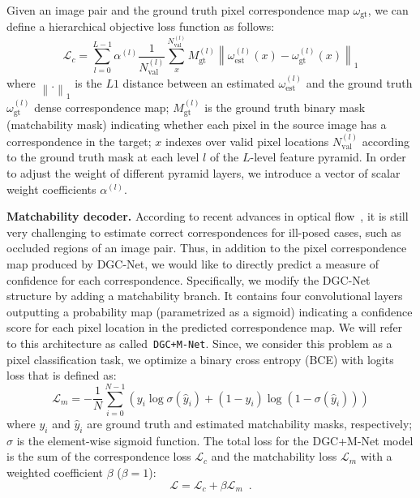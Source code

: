 \documentclass[10pt,twocolumn,letterpaper]{article}
\begin{document}
Given an image pair and the ground truth pixel correspondence map $\omega_\text{gt}$, we can define a hierarchical objective loss function as follows: 
\begin{equation}\label{eq:eq_loss_crsp}
    \mathcal{L}_c = \sum_{l=0}^{L-1} \alpha^{\left(l\right)} \frac{1}{N_\text{val}^{\left(l\right)}} \sum_{x}^{N_\text{val}^{\left(l\right)}} M_\text{gt}^{\left(l\right)} \left\| \omega_\text{est}^{\left(l\right)}\left(x\right) - \omega_\text{gt}^{\left(l\right)}\left(x\right)  \right\|_1
\end{equation}
\noindent where $\left\| . \right\|_1$ is the $L1$ distance between an estimated $\omega_\text{est}^{\left(l\right)}$ and the ground truth $\omega_\text{gt}^{\left(l\right)}$ dense correspondence map; $M_\text{gt}^{\left(l\right)}$ is the ground truth binary mask (matchability mask) indicating whether each pixel in the source image has a correspondence in the target; $x$ indexes over valid pixel locations $N_\text{val}^{\left(l\right)}$ according to the ground truth mask at each level $l$ of the $L$-level feature pyramid. In order to adjust the weight of different pyramid layers, we introduce a vector of scalar weight coefficients $\alpha^{\left(l\right)}$. 

\noindent\textbf{Matchability decoder.}
According to recent advances in optical flow~\cite{Janai2018ECCV,PWC-Net}, it is still very challenging to estimate correct correspondences for ill-posed cases, such as occluded regions of an image pair. Thus, in addition to the pixel correspondence map produced by DGC-Net, we would like to directly predict a measure of confidence for each correspondence. Specifically, we  modify the DGC-Net structure by adding a matchability branch. It contains four convolutional layers outputting a probability map (parametrized as a sigmoid) indicating a confidence score for each pixel location in the predicted correspondence map. We will refer to this architecture as called~\texttt{DGC+M-Net}. Since, we consider this problem as a pixel classification task, we optimize a binary cross entropy (BCE) with logits loss that is defined as:
\begin{equation}\label{eq:eq_loss_map}
    \mathcal{L}_{m} = -\frac{1}{N}\sum_{i=0}^{N-1}\left(y_i\log\sigma\left(\hat{y}_i\right) + \left(1 - y_i\right)\log\left(1-\sigma\left(\hat{y}_i\right)\right)\right)
\end{equation}
\noindent where $y_i$ and $\hat{y}_i$ are ground truth and  estimated matchability masks, respectively; $\sigma$ is the element-wise sigmoid function. The total loss for the DGC+M-Net model is the sum of the correspondence loss $\mathcal{L}_{c}$ and the matchability loss $\mathcal{L}_{m}$ with a weighted coefficient $\beta$ ($\beta=1$):
\begin{equation}
    \mathcal{L} = \mathcal{L}_{c} + \beta \mathcal{L}_{m} \enspace .
\end{equation}
\end{document}
